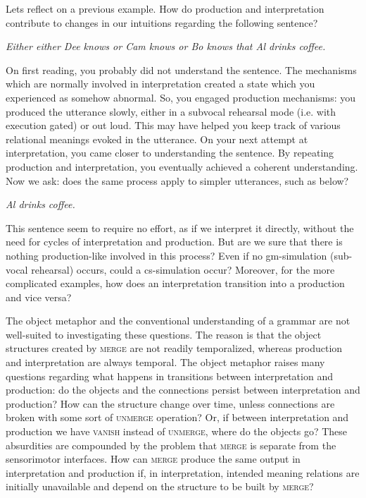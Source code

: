   Lets reflect on a previous example. How do production and interpretation contribute to changes in our intuitions regarding the following sentence? 

    \textit{Either either Dee knows or Cam knows or Bo knows that Al drinks coffee.}

  On first reading, you probably did not understand the sentence. The mechanisms which are normally involved in interpretation created a state which you experienced as somehow abnormal. So, you engaged production mechanisms: you produced the utterance slowly, either in a subvocal rehearsal mode (i.e. with execution gated) or out loud. This may have helped you keep track of various relational meanings evoked in the utterance. On your next attempt at interpretation, you came closer to understanding the sentence. By repeating production and interpretation, you eventually achieved a coherent understanding. Now we ask: does the same process apply to simpler utterances, such as below?

    \textit{Al drinks coffee.}

  This sentence seem to require no effort, as if we interpret it directly, without the need for cycles of interpretation and production. But are we sure that there is nothing production-like involved in this process? Even if no gm-simulation (sub-vocal rehearsal) occurs, could a cs-simulation occur? Moreover, for the more complicated examples, how does an interpretation transition into a production and vice versa?

  The object metaphor and the conventional understanding of a grammar are not well-suited to investigating these questions. The reason is that the object structures created by \textsc{merge} are not readily temporalized, whereas production and interpretation are always temporal. The object metaphor raises many questions regarding what happens in transitions between interpretation and production: do the objects and the connections persist between interpretation and production? How can the structure change over time, unless connections are broken with some sort of \textsc{unmerge} operation? Or, if between interpretation and production we have \textsc{vanish} instead of \textsc{unmerge}, where do the objects go? These absurdities are compounded by the problem that \textsc{merge} is separate from the sensorimotor interfaces. How can \textsc{merge} produce the same output in interpretation and production if, in interpretation, intended meaning relations are initially unavailable and depend on the structure to be built by \textsc{merge?} 

